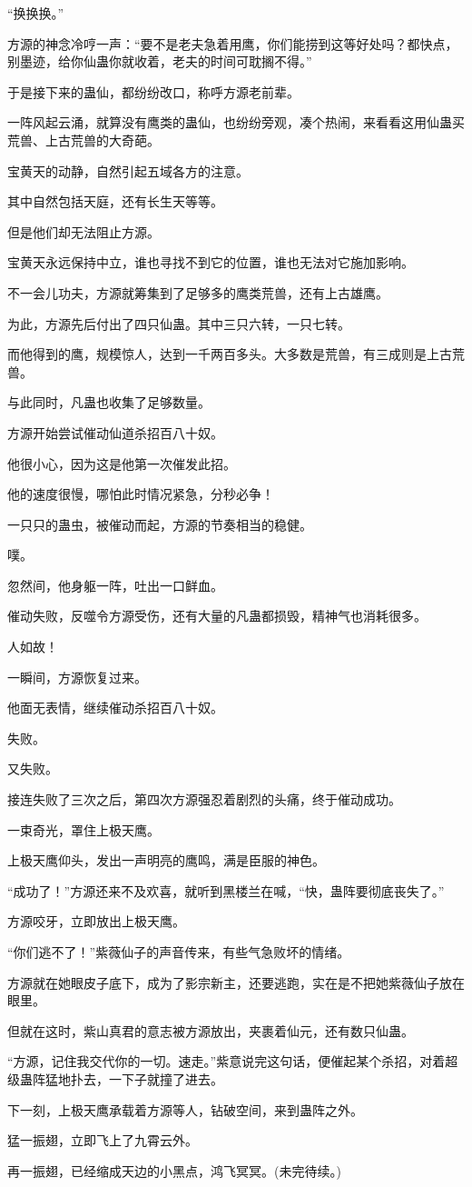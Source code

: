 \begin{this_body}
“换换换。”

方源的神念冷哼一声：“要不是老夫急着用鹰，你们能捞到这等好处吗？都快点，别墨迹，给你仙蛊你就收着，老夫的时间可耽搁不得。”

于是接下来的蛊仙，都纷纷改口，称呼方源老前辈。

一阵风起云涌，就算没有鹰类的蛊仙，也纷纷旁观，凑个热闹，来看看这用仙蛊买荒兽、上古荒兽的大奇葩。

宝黄天的动静，自然引起五域各方的注意。

其中自然包括天庭，还有长生天等等。

但是他们却无法阻止方源。

宝黄天永远保持中立，谁也寻找不到它的位置，谁也无法对它施加影响。

不一会儿功夫，方源就筹集到了足够多的鹰类荒兽，还有上古雄鹰。

为此，方源先后付出了四只仙蛊。其中三只六转，一只七转。

而他得到的鹰，规模惊人，达到一千两百多头。大多数是荒兽，有三成则是上古荒兽。

与此同时，凡蛊也收集了足够数量。

方源开始尝试催动仙道杀招百八十奴。

他很小心，因为这是他第一次催发此招。

他的速度很慢，哪怕此时情况紧急，分秒必争！

一只只的蛊虫，被催动而起，方源的节奏相当的稳健。

噗。

忽然间，他身躯一阵，吐出一口鲜血。

催动失败，反噬令方源受伤，还有大量的凡蛊都损毁，精神气也消耗很多。

人如故！

一瞬间，方源恢复过来。

他面无表情，继续催动杀招百八十奴。

失败。

又失败。

接连失败了三次之后，第四次方源强忍着剧烈的头痛，终于催动成功。

一束奇光，罩住上极天鹰。

上极天鹰仰头，发出一声明亮的鹰鸣，满是臣服的神色。

“成功了！”方源还来不及欢喜，就听到黑楼兰在喊，“快，蛊阵要彻底丧失了。”

方源咬牙，立即放出上极天鹰。

“你们逃不了！”紫薇仙子的声音传来，有些气急败坏的情绪。

方源就在她眼皮子底下，成为了影宗新主，还要逃跑，实在是不把她紫薇仙子放在眼里。

但就在这时，紫山真君的意志被方源放出，夹裹着仙元，还有数只仙蛊。

“方源，记住我交代你的一切。速走。”紫意说完这句话，便催起某个杀招，对着超级蛊阵猛地扑去，一下子就撞了进去。

下一刻，上极天鹰承载着方源等人，钻破空间，来到蛊阵之外。

猛一振翅，立即飞上了九霄云外。

再一振翅，已经缩成天边的小黑点，鸿飞冥冥。(未完待续。)

\end{this_body}

